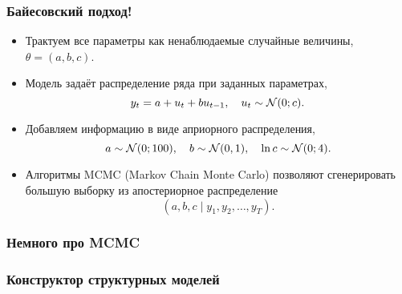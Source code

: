 \begin{frame}
  \frametitle{Байесовский подход!}

  \begin{itemize}[<+->]
    \item Трактуем все параметры как ненаблюдаемые \alert{случайные величины}, $\theta = (a, b, c)$.
    \item \alert{Модель} задаёт распределение ряда при заданных параметрах,
    \[
    y_t = a + u_t + b u_{t-1}, \quad u_t \sim \mathcal{N}(0; c).  
    \]
    \item Добавляем информацию в виде \alert{априорного распределения},
    \[
    a \sim \mathcal{N}(0;100), \quad b \sim \mathcal{N}(0, 1), \quad \ln c \sim \mathcal{N}(0;4).  
    \]
    \item Алгоритмы MCMC (Markov Chain Monte Carlo) позволяют 
    сгенерировать большую выборку из \alert{апостериорное распределение}
    \[
    (a, b, c \mid y_1, y_2, \ldots, y_T).
    \]
\end{itemize}

\end{frame}


\begin{frame}
  \frametitle{Немного про MCMC}
  
\begin{itemize}
  
\end{itemize}

\end{frame}

\begin{frame}
  \frametitle{Конструктор структурных моделей}

  

\end{frame}


